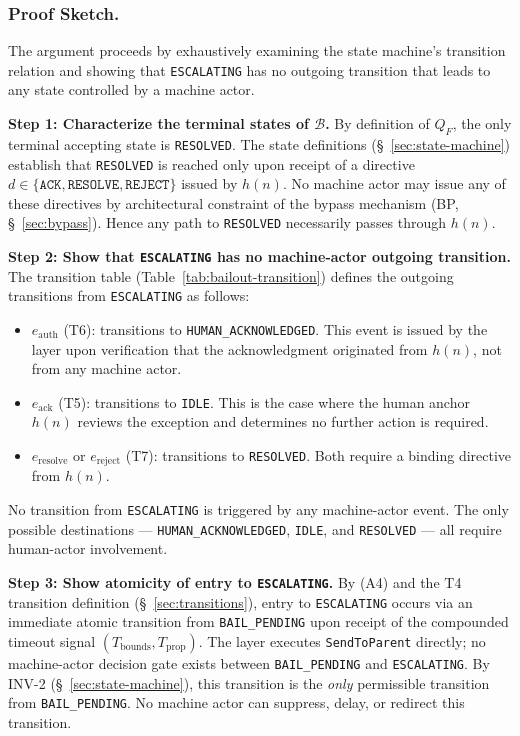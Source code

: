 \subsubsection{Proof Sketch.}

The argument proceeds by exhaustively examining the state machine's transition relation and showing that \texttt{ESCALATING} has no outgoing transition that leads to any state controlled by a machine actor.

\medskip
\noindent\textbf{Step 1: Characterize the terminal states of $\mathcal{B}$.} By definition of $Q_F$, the only terminal accepting state is \texttt{RESOLVED}. The state definitions (\S~\ref{sec:state-machine}) establish that \texttt{RESOLVED} is reached only upon receipt of a directive $d \in \{\texttt{ACK}, \texttt{RESOLVE}, \texttt{REJECT}\}$ issued by $h(n)$. No machine actor may issue any of these directives by architectural constraint of the bypass mechanism (BP, \S~\ref{sec:bypass}). Hence any path to \texttt{RESOLVED} necessarily passes through $h(n)$.

\medskip
\noindent\textbf{Step 2: Show that \texttt{ESCALATING} has no machine-actor outgoing transition.} The transition table (Table~\ref{tab:bailout-transition}) defines the outgoing transitions from \texttt{ESCALATING} as follows:
\begin{itemize}
\item $e_{\text{auth}}$ (T6): transitions to \texttt{HUMAN\_ACKNOWLEDGED}. This event is issued by the \fact{} layer upon verification that the acknowledgment originated from $h(n)$, not from any machine actor.
\item $e_{\text{ack}}$ (T5): transitions to \texttt{IDLE}. This is the case where the human anchor $h(n)$ reviews the exception and determines no further action is required.
\item $e_{\text{resolve}}$ or $e_{\text{reject}}$ (T7): transitions to \texttt{RESOLVED}. Both require a binding directive from $h(n)$.
\end{itemize}
No transition from \texttt{ESCALATING} is triggered by any machine-actor event. The only possible destinations — \texttt{HUMAN\_ACKNOWLEDGED}, \texttt{IDLE}, and \texttt{RESOLVED} — all require human-actor involvement.

\medskip
\noindent\textbf{Step 3: Show atomicity of entry to \texttt{ESCALATING}.} By (A4) and the T4 transition definition (\S~\ref{sec:transitions}), entry to \texttt{ESCALATING} occurs via an immediate atomic transition from \texttt{BAIL\_PENDING} upon receipt of the compounded timeout signal $(T_{\text{bounds}}, T_{\text{prop}})$. The \fact{} layer executes \texttt{SendToParent} directly; no machine-actor decision gate exists between \texttt{BAIL\_PENDING} and \texttt{ESCALATING}. By INV-2 (\S~\ref{sec:state-machine}), this transition is the \emph{only} permissible transition from \texttt{BAIL\_PENDING}. No machine actor can suppress, delay, or redirect this transition.

